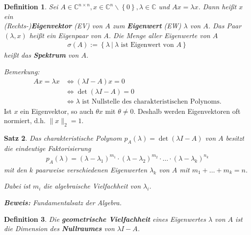 \documentclass[%
a4paper,
11pt,		%
]
{scrartcl}
\theoremstyle{plain}
\newtheorem{mydef}{Definition}[section]
\theoremstyle{plain}
\newtheorem{mysatz}[mydef]{Satz}
\theoremstyle{plain}
\theoremstyle{plain}
\begin{document}
\begin{mydef}
Sei $A \in \mathbb{C}^{n \times n}, x \in \mathbb{C}^n \backslash \left\{ 0 \right\}, \lambda \in \mathbb{C}$ und $Ax = \lambda x$. Dann heißt $x$ ein\\
(Rechts-)\textbf{Eigenvektor} (EV) von $A$ zum \textbf{Eigenwert} (EW) $\lambda$ von $A$. Das Paar $(\lambda, x)$ heißt ein Eigenpaar von $A$. Die Menge aller Eigenwerte von $A$
\begin{align*}
\sigma(A) := \left\{ \lambda \ | \ \lambda \text{ ist Eigenwert von } A \right\}
\end{align*}
heißt das \textbf{Spektrum} von $A$.
\end{mydef}
\textit{Bemerkung:}\\[-1.3cm] %
\begin{align*}
Ax = \lambda x & \Leftrightarrow (\lambda I - A)x = 0 \\
 & \Leftrightarrow \det(\lambda I - A)=0\\
 & \Leftrightarrow \lambda \text{ ist Nullstelle des charakteristischen Polynoms.}
\end{align*}
Ist $x$ ein Eigenvektor, so auch $\theta x$ mit $\theta \neq 0$. Deshalb werden Eigenvektoren oft normiert, d.h. $\| x \|_2=1$.\\

\begin{mysatz}
Das charakteristische Polynom $p_A(\lambda) = \det(\lambda I - A)$ von $A$ besitzt die eindeutige Faktorisierung
\begin{align*}
p_A(\lambda) = (\lambda - \lambda_1)^{m_1} \cdot (\lambda - \lambda_2)^{m_2} \cdot \ldots \cdot (\lambda - \lambda_k)^{n_k}
\end{align*}
mit den $k$ paarweise verschiedenen Eigenwerten $\lambda_k$ von $A$ mit $m_1 + \ldots + m_k = n$.

Dabei ist $m_i$ die algebraische Vielfachheit von $\lambda_i$.\newline

\textbf{Beweis:} Fundamentalsatz der Algebra.
\end{mysatz}

\begin{mydef}
  Die \textbf{geometrische Vielfachheit} eines Eigenwertes $\lambda$ von $A$ ist die Dimension des \textbf{Nullraumes} von $\lambda I -A$.
\end{mydef}

\end{document}

